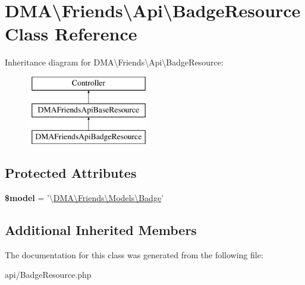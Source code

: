 \hypertarget{classDMA_1_1Friends_1_1Api_1_1BadgeResource}{\section{D\+M\+A\textbackslash{}Friends\textbackslash{}Api\textbackslash{}Badge\+Resource Class Reference}
\label{classDMA_1_1Friends_1_1Api_1_1BadgeResource}
}
Inheritance diagram for D\+M\+A\textbackslash{}Friends\textbackslash{}Api\textbackslash{}Badge\+Resource\+:\begin{figure}[H]
\begin{center}
\leavevmode
\includegraphics[height=3.000000cm]{d4/d95/classDMA_1_1Friends_1_1Api_1_1BadgeResource}
\end{center}
\end{figure}
\subsection*{Protected Attributes}
\begin{DoxyCompactItemize}
\item 
\hypertarget{classDMA_1_1Friends_1_1Api_1_1BadgeResource_ac4a608f9e0378780c36e0751eb346699}{{\bfseries \$model} = '\textbackslash{}\hyperlink{classDMA_1_1Friends_1_1Models_1_1Badge}{D\+M\+A\textbackslash{}\+Friends\textbackslash{}\+Models\textbackslash{}\+Badge}'}\label{classDMA_1_1Friends_1_1Api_1_1BadgeResource_ac4a608f9e0378780c36e0751eb346699}

\end{DoxyCompactItemize}
\subsection*{Additional Inherited Members}


The documentation for this class was generated from the following file\+:\begin{DoxyCompactItemize}
\item 
api/Badge\+Resource.\+php\end{DoxyCompactItemize}
